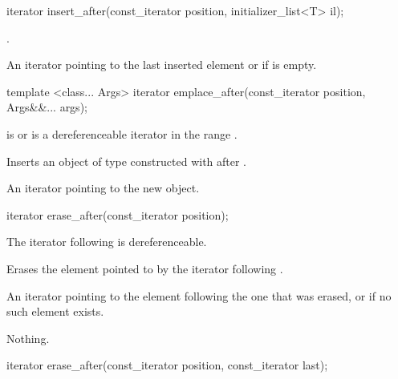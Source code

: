 %
\begin{itemdecl}
iterator insert_after(const_iterator position, initializer_list<T> il);
\end{itemdecl}

\begin{itemdescr}
\pnum
\effects {}.

\pnum
\returns
An iterator pointing to the last inserted element or  if  is empty.
\end{itemdescr}


%
\begin{itemdecl}
template <class... Args>
  iterator emplace_after(const_iterator position, Args&&... args);
\end{itemdecl}

\begin{itemdescr}
\pnum
\requires {} is  or is a dereferenceable
iterator in the range .

\pnum
\effects Inserts an object of type  constructed with
 after .

\pnum
\returns An iterator pointing to the new object.
\end{itemdescr}

%
\begin{itemdecl}
iterator erase_after(const_iterator position);
\end{itemdecl}

\begin{itemdescr}
\pnum
\requires The iterator following  is dereferenceable.

\pnum
\effects Erases the element pointed to by the iterator following .

\pnum
\returns An iterator pointing to the element following the one that was
erased, or  if no such element exists.

\pnum
\throws Nothing.
\end{itemdescr}

%
\begin{itemdecl}
iterator erase_after(const_iterator position, const_iterator last);
\end{itemdecl}

